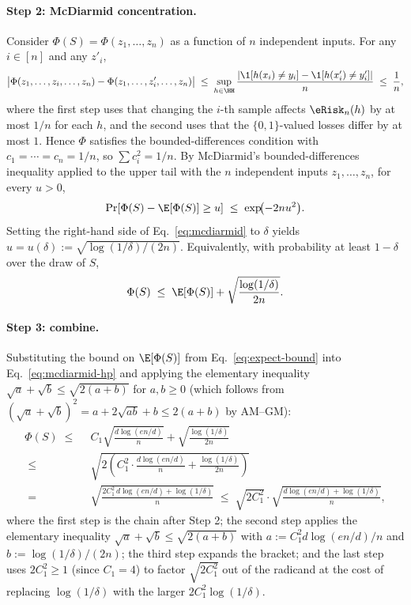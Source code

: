 \paragraph{Step 2: McDiarmid concentration.}
Consider $\Phi(S) = \Phi(z_1, \ldots, z_n)$ as a function of $n$ independent inputs. For any $i \in [n]$ and any $z'_i$,
\begin{align*}
\bigl| \Phi(z_1, \ldots, z_i, \ldots, z_n) - \Phi(z_1, \ldots, z'_i, \ldots, z_n) \bigr|
\;\le\;
\sup_{h \in \HH} \frac{|\1[h(x_i) \ne y_i] - \1[h(x'_i) \ne y'_i]|}{n}
\;\le\; \frac{1}{n},
\end{align*}
where the first step uses that changing the $i$-th sample affects $\eRisk_n(h)$ by at most $1/n$ for each $h$, and the second uses that the $\{0,1\}$-valued losses differ by at most $1$. Hence $\Phi$ satisfies the bounded-differences condition with $c_1 = \cdots = c_n = 1/n$, so $\sum c_i^2 = 1/n$. By McDiarmid's bounded-differences inequality applied to the upper tail with the $n$ independent inputs $z_1, \ldots, z_n$, for every $u > 0$,
\begin{align}\label{eq:mcdiarmid}
\Pr\!\left[ \Phi(S) - \E[\Phi(S)] \ge u \right]
\;\le\; \exp\!\bigl( -2 n u^2 \bigr).
\end{align}
Setting the right-hand side of Eq.~\eqref{eq:mcdiarmid} to $\delta$ yields $u = u(\delta) := \sqrt{\log(1/\delta) / (2n)}$. Equivalently, with probability at least $1 - \delta$ over the draw of $S$,
\begin{align}\label{eq:mcdiarmid-hp}
\Phi(S) \;\le\; \E[\Phi(S)] + \sqrt{\frac{\log(1/\delta)}{2n}}.
\end{align}

\paragraph{Step 3: combine.}
Substituting the bound on $\E[\Phi(S)]$ from Eq.~\eqref{eq:expect-bound} into Eq.~\eqref{eq:mcdiarmid-hp} and applying the elementary inequality $\sqrt{a} + \sqrt{b} \le \sqrt{2(a + b)}$ for $a, b \ge 0$ (which follows from $(\sqrt{a} + \sqrt{b})^2 = a + 2\sqrt{ab} + b \le 2(a+b)$ by AM--GM):
\begin{align*}
\Phi(S)
\;\le\; & ~ C_1 \sqrt{\frac{d \log(en/d)}{n}} + \sqrt{\frac{\log(1/\delta)}{2n}} \\
\;\le\; & ~ \sqrt{2 \!\left( C_1^2 \cdot \frac{d \log(en/d)}{n} + \frac{\log(1/\delta)}{2n} \right)} \\
\;=\; & ~ \sqrt{\frac{2 C_1^2 \, d \log(en/d) + \log(1/\delta)}{n}}
\;\le\; \sqrt{2 C_1^2} \cdot \sqrt{\frac{d \log(en/d) + \log(1/\delta)}{n}},
\end{align*}
where the first step is the chain after Step 2; the second step applies the elementary inequality $\sqrt{a} + \sqrt{b} \le \sqrt{2(a+b)}$ with $a := C_1^2 d \log(en/d)/n$ and $b := \log(1/\delta)/(2n)$; the third step expands the bracket; and the last step uses $2 C_1^2 \ge 1$ (since $C_1 = 4$) to factor $\sqrt{2 C_1^2}$ out of the radicand at the cost of replacing $\log(1/\delta)$ with the larger $2 C_1^2 \log(1/\delta)$.

